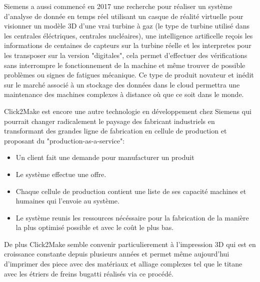             Siemens a aussi commencé en 2017 une recherche pour réaliser un système d'analyse 
            de donnée en temps réel utilisant un casque de réalité virtuelle pour visionner 
            un modèle 3D d'une vrai turbine à gaz (le type de turbine utilisé dans les 
            centrales éléctriques, centrales nucléaires), une intelligence artificelle reçois les 
            informations de centaines de capteurs sur la turbine réelle et les interpretes
            pour les transposer sur la version "digitales", cela permet d'effectuer
            des vérifications sans interrompre le fonctionnement de la machine 
            et même trouver de possible problèmes ou signes de fatigues mécanique. \newline
            Ce type de produit novateur et inédit sur le marché associé à 
            un stockage des données dans le cloud permettra une maintenance 
            des machines complexes à distance où que ce soit dans le monde. \newline 




            Click2Make est encore une autre technologie en développement chez Siemens 
            qui pourrait changer radicalement le paysage des fabricant industriels
            en transformant des grandes ligne de fabrication en cellule de production 
            et proposant du "production-as-a-service": \newline
            \begin{itemize}
                \item Un client fait une demande pour manufacturer un produit
                \item Le système effectue une offre.
                \item Chaque cellule de production contient une liste de ses capacité machines et 
                humaines qui l'envoie au système.
                \item Le système reunis les ressources nécéssaire pour la fabrication de la manière
                la plus optimisé possible et avec le coût le plus bas. \newline
            \end{itemize}


            De plus Click2Make semble convenir particulierement à l'impression 3D qui est 
            en croissance constante depuis plusieurs années et permet même aujourd'hui 
            d'imprimer des piece avec des matériaux et alliage complexes tel que le titane avec 
            les étriers de freins bugatti réalisés via ce procédé. 
            \newpage


